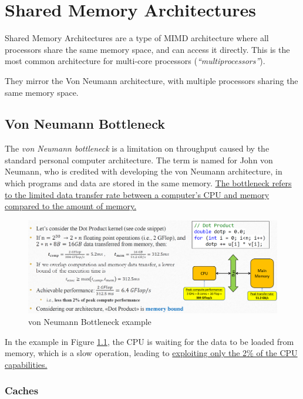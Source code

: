 \chapter{Shared Memory Architectures}
\label{ch:04/shared-memory-architectures}

Shared Memory Architectures are a type of MIMD architecture where all processors share the same memory space, and can access it directly. This is the most common architecture for multi-core processors (\textit{``multiprocessors''}).

They mirror the Von Neumann architecture, with multiple processors sharing the same memory space.

\section{Von Neumann Bottleneck}

\begin{definition}
   The \textit{von Neumann bottleneck} is a limitation on throughput caused by the standard personal computer architecture. The term is named for John von Neumann, who is credited with developing the von Neumann architecture, in which programs and data are stored in the same memory. \ul{The bottleneck refers to the limited data transfer rate between a computer's CPU and memory compared to the amount of memory.}
\end{definition}

\begin{figure}[htbp]
   \centering
   \includegraphics{images/04/neumann_example.png}
   \caption{von Neumann Bottleneck example}
   \label{fig:04/neumann_example}
\end{figure}

In the example in Figure \ref{fig:04/neumann_example}, the CPU is waiting for the data to be loaded from memory, which is a slow operation, leading to \ul{exploiting only the 2\% of the CPU capabilities.}

\subsection{Caches}

